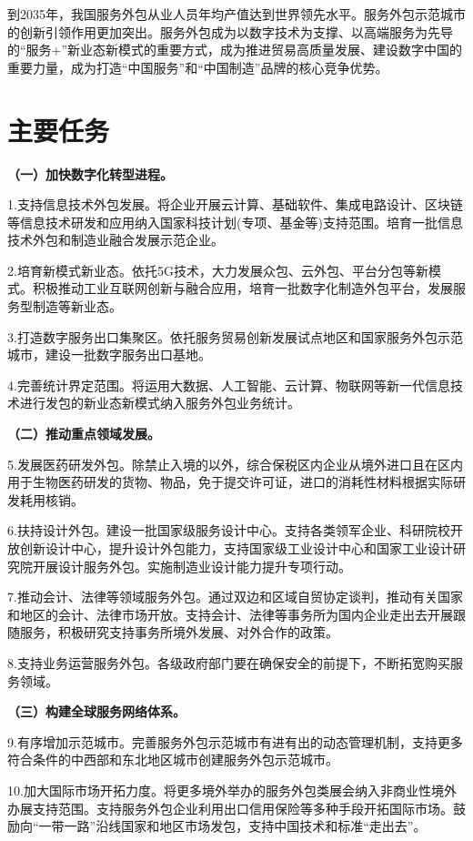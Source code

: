 到2035年，我国服务外包从业人员年均产值达到世界领先水平。服务外包示范城市的创新引领作用更加突出。服务外包成为以数字技术为支撑、以高端服务为先导的“服务+”新业态新模式的重要方式，成为推进贸易高质量发展、建设数字中国的重要力量，成为打造“中国服务”和“中国制造”品牌的核心竞争优势。

\section{主要任务}

{ \bf （一）加快数字化转型进程。 }

1.支持信息技术外包发展。将企业开展云计算、基础软件、集成电路设计、区块链等信息技术研发和应用纳入国家科技计划(专项、基金等)支持范围。培育一批信息技术外包和制造业融合发展示范企业。

2.培育新模式新业态。依托5G技术，大力发展众包、云外包、平台分包等新模式。积极推动工业互联网创新与融合应用，培育一批数字化制造外包平台，发展服务型制造等新业态。

3.打造数字服务出口集聚区。依托服务贸易创新发展试点地区和国家服务外包示范城市，建设一批数字服务出口基地。

4.完善统计界定范围。将运用大数据、人工智能、云计算、物联网等新一代信息技术进行发包的新业态新模式纳入服务外包业务统计。

{ \bf （二）推动重点领域发展。 }

5.发展医药研发外包。除禁止入境的以外，综合保税区内企业从境外进口且在区内用于生物医药研发的货物、物品，免于提交许可证，进口的消耗性材料根据实际研发耗用核销。

6.扶持设计外包。建设一批国家级服务设计中心。支持各类领军企业、科研院校开放创新设计中心，提升设计外包能力，支持国家级工业设计中心和国家工业设计研究院开展设计服务外包。实施制造业设计能力提升专项行动。

7.推动会计、法律等领域服务外包。通过双边和区域自贸协定谈判，推动有关国家和地区的会计、法律市场开放。支持会计、法律等事务所为国内企业走出去开展跟随服务，积极研究支持事务所境外发展、对外合作的政策。

8.支持业务运营服务外包。各级政府部门要在确保安全的前提下，不断拓宽购买服务领域。

{ \bf （三）构建全球服务网络体系。 }

9.有序增加示范城市。完善服务外包示范城市有进有出的动态管理机制，支持更多符合条件的中西部和东北地区城市创建服务外包示范城市。

10.加大国际市场开拓力度。将更多境外举办的服务外包类展会纳入非商业性境外办展支持范围。支持服务外包企业利用出口信用保险等多种手段开拓国际市场。鼓励向“一带一路”沿线国家和地区市场发包，支持中国技术和标准“走出去”。

